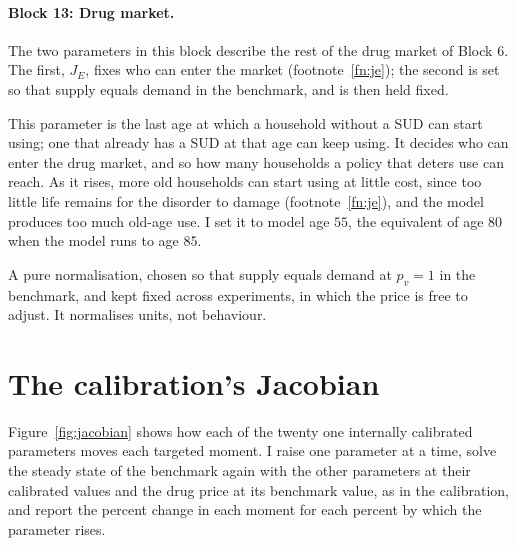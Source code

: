 \documentclass[10pt]{article}
\begin{document}
\paragraph{Block 13: Drug market.} The two parameters in this block describe the rest of the drug
market of Block 6. The first, $J_E$, fixes who can enter the market (footnote~\ref{fn:je}); the second is set so that supply equals demand in the benchmark, and is
then held fixed.
\begin{description}\setlength{\itemsep}{0.25em}\setlength{\parskip}{0em}

\item[$J_E$, the last age at which use can begin.] This parameter is the last age at which a household without a SUD can start using; one that already has a SUD at that age can keep using. It decides who can enter the drug market, and so how many households a policy that deters use can reach. As it rises, more old households can start using at little cost, since too little life remains for the disorder to damage (footnote~\ref{fn:je}), and the model produces too much old-age use. I set it to model age $55$, the equivalent of age $80$ when the model runs to age $85$.

\item[$\nu_1$, the supply shifter.] A pure normalisation, chosen so that supply
equals demand at $p_v=1$ in the benchmark, and kept fixed across experiments, in which the price is free to adjust. It normalises units, not behaviour.

\end{description}

\clearpage
\setcounter{figure}{0}
\section{The calibration's Jacobian}\label{sec:jacobian}

Figure~\ref{fig:jacobian} shows how each of the twenty one internally calibrated parameters moves each targeted moment. I raise one parameter at a time, solve the steady state of the benchmark again with the other parameters at their calibrated values and the drug price at its benchmark value, as in the calibration, and report the percent change in each moment for each percent by which the parameter rises. 
\end{document}
